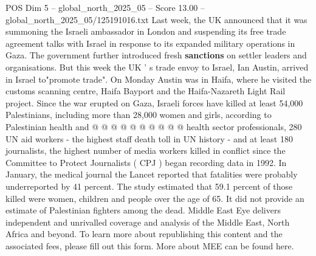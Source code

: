 \begin{textsample}{POS Dim 5 – global\_north\_2025\_05 – Score 13.00 – global\_north\_2025\_05/125191016.txt}
Last week, the UK announced that it was summoning the Israeli ambassador in London and suspending its free trade agreement talks with Israel in response to its expanded military operations in Gaza.
The government further introduced fresh \textbf{sanctions} on settler leaders and organisations.
But this week the UK ' s trade envoy to Israel, Ian Austin, arrived in Israel to"promote trade".
On Monday Austin was in Haifa, where he visited the customs scanning centre, Haifa Bayport and the Haifa-Nazareth Light Rail project.
Since the war erupted on Gaza, Israeli forces have killed at least 54,000 Palestinians, including more than 28,000 women and girls, according to Palestinian health and @ @ @ @ @ @ @ @ @ @ health sector professionals, 280 UN aid workers - the highest staff death toll in UN history - and at least 180 journalists, the highest number of media workers killed in conflict since the Committee to Protect Journalists ( CPJ ) began recording data in 1992.
In January, the medical journal the Lancet reported that fatalities were probably underreported by 41 percent.
The study estimated that 59.1 percent of those killed were women, children and people over the age of 65.
It did not provide an estimate of Palestinian fighters among the dead.
Middle East Eye delivers independent and unrivalled coverage and analysis of the Middle East, North Africa and beyond.
To learn more about republishing this content and the associated fees, please fill out this form.
More about MEE can be found here.

\end{textsample}
